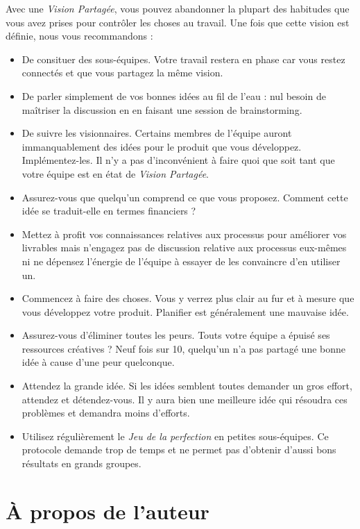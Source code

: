 \documentclass[11pt]{book}
\begin{document}
Avec une \emph{Vision Partagée}, vous pouvez abandonner la plupart des habitudes que vous avez prises pour 
contrôler les choses au travail. Une fois que cette vision est définie, nous vous recommandons :
\begin{itemize}
	\item De consituer des sous-équipes. Votre travail restera en phase car vous restez connectés et que 
	      vous partagez la même vision.
	\item De parler simplement de vos bonnes idées au fil de l'eau : nul besoin de maîtriser la discussion
	      en en faisant une session de \og{}brainstorming\fg{}.
	\item De suivre les visionnaires. Certains membres de l'équipe auront immanquablement des idées pour 
	      le produit que vous développez. Implémentez-les. Il n'y a pas d'inconvénient à faire quoi que soit
	      tant que votre équipe est en état de \emph{Vision Partagée}.
	\item Assurez-vous que quelqu'un comprend ce que vous proposez. Comment cette idée se traduit-elle en 
	      termes financiers ?
	\item Mettez à profit vos connaissances relatives aux processus pour améliorer vos livrables mais
	      n'engagez pas de discussion relative aux processus eux-mêmes ni ne dépensez l'énergie de l'équipe
	      à essayer de les convaincre d'en utiliser un.
	\item Commencez à faire des choses. Vous y verrez plus clair au fur et à mesure que vous développez 
	      votre produit. \og{}Planifier\fg{} est généralement une mauvaise idée. 
	\item Assurez-vous d'éliminer toutes les peurs. Touts votre équipe a épuisé ses ressources créatives ?
	      Neuf fois sur 10, quelqu'un n'a pas partagé une bonne idée à cause d'une peur quelconque. 
	\item Attendez la grande idée. Si les idées semblent toutes demander un gros effort, attendez et 
	      détendez-vous. Il y aura bien une meilleure idée qui résoudra ces problèmes et demandra 
	      moins d'efforts.
	\item Utilisez régulièrement le \emph{Jeu de la perfection} en petites sous-équipes. Ce protocole
	      demande trop de temps et ne permet pas d'obtenir d'aussi bons résultats en grands groupes.
\end{itemize}

\chapter*{À propos de l'auteur}
\end{document}
